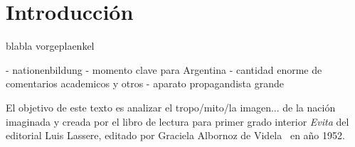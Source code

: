 \section{Introducción}
blabla vorgeplaenkel

- nationenbildung
- momento clave para Argentina
- cantidad enorme de comentarios academicos y otros
- aparato propagandista grande

El objetivo de este texto es analizar el tropo/mito/la imagen... de la nación imaginada y creada por el libro de lectura para primer grado interior \textit{Evita} del editorial Luis Lassere, editado por Graciela Albornoz de Videla~\cite{Albornoz1952} en año 1952.

